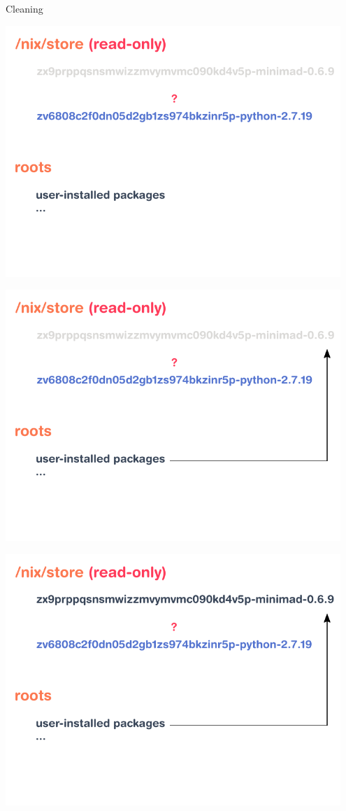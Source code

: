 \documentclass[a4paper]{beamer}
\begin{document}
\begin{frame}{Cleaning}
     {
        \begin{center}
            \includegraphics[width=0.95\textwidth]{img/schema-nix-store-cleaning-roots.pdf}
        \end{center}
    }
     {
        \begin{center}
            \includegraphics[width=0.95\textwidth]{img/schema-nix-store-gc-1.pdf}
        \end{center}
    }
     {
        \begin{center}
            \includegraphics[width=0.95\textwidth]{img/schema-nix-store-gc-2.pdf}

\end{center}}
\end{frame}
\end{document}
